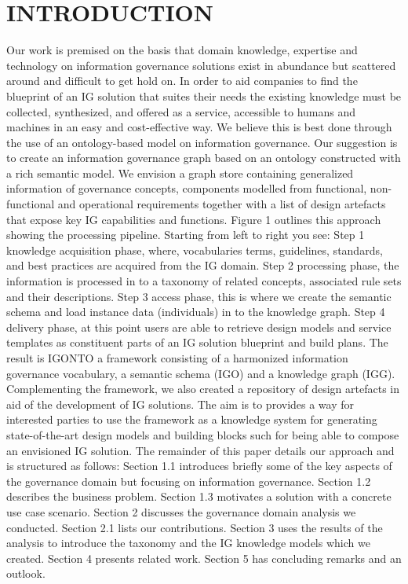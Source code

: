 \documentclass[a4paper,twoside]{article}
\begin{document}
\section{\uppercase{introduction}}
\label{sec:INTRODUCTION}
Our work is premised on the basis that domain knowledge, expertise and technology on information governance solutions exist in abundance but scattered around and difficult to get hold on. In order to aid companies to find the blueprint of an IG solution that suites their needs the existing knowledge must be collected, synthesized, and offered as a service, accessible to humans and machines in an easy and cost-effective way. We believe this is best done through the use of an ontology-based model on information governance. Our suggestion is to create an information governance graph based on an ontology constructed with a rich semantic model. We envision a graph store containing generalized information of governance concepts, components modelled from functional, non-functional and operational requirements together with a list of design artefacts that expose key IG capabilities and functions. Figure 1 outlines this approach showing the processing pipeline. Starting from left to right you see: Step 1 knowledge acquisition phase, where, vocabularies terms, guidelines, standards, and best practices are acquired from the IG domain. Step 2 processing phase, the information is processed in to a taxonomy of related concepts, associated rule sets and their descriptions. Step 3 access phase, this is where we create the semantic schema and load instance data (individuals) in to the knowledge graph.  Step 4 delivery phase, at this point users are able to retrieve design models and service templates as constituent parts of an IG solution blueprint and build plans. The result is IGONTO a framework consisting of a harmonized information governance vocabulary, a semantic schema (IGO) and a knowledge graph (IGG). Complementing the framework, we also created a repository of design artefacts in aid of the development of IG solutions. The aim is to provides a way for interested parties to use the framework as a knowledge system for generating state-of-the-art design models and building blocks such for being able to compose an envisioned IG solution. 
The remainder of this paper details our approach and is structured as follows: Section 1.1 introduces briefly some of the key aspects of the governance domain but focusing on information governance. Section 1.2 describes the business problem. Section 1.3 motivates a solution with a concrete use case scenario. Section 2 discusses the governance domain analysis we conducted. Section 2.1 lists our contributions. Section 3 uses the results of the analysis to introduce the taxonomy and the IG knowledge models which we created. Section 4 presents related work. Section 5 has concluding remarks and an outlook.
\end{document}
